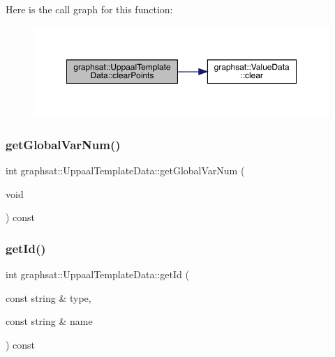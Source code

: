Here is the call graph for this function\+:
\nopagebreak
\begin{figure}[H]
\begin{center}
\leavevmode
\includegraphics[width=350pt]{classgraphsat_1_1_uppaal_template_data_a308dd0e29dc2eb35ec12c26597f6929b_cgraph}
\end{center}
\end{figure}
\mbox{\label{classgraphsat_1_1_uppaal_template_data_a2096eb0ebe7785f494c2bdcc02ac6bd8}} 
\subsubsection{\texorpdfstring{getGlobalVarNum()}{getGlobalVarNum()}}
{\footnotesize\ttfamily int graphsat\+::\+Uppaal\+Template\+Data\+::get\+Global\+Var\+Num (\begin{DoxyParamCaption}\item[{void}]{ }\end{DoxyParamCaption}) const\hspace{0.3cm}{\ttfamily [inline]}}

\mbox{\label{classgraphsat_1_1_uppaal_template_data_ab7517b8ab8d2c8372536603fb2dbf406}} 
\subsubsection{\texorpdfstring{getId()}{getId()}}
{\footnotesize\ttfamily int graphsat\+::\+Uppaal\+Template\+Data\+::get\+Id (\begin{DoxyParamCaption}\item[{const string \&}]{type,  }\item[{const string \&}]{name }\end{DoxyParamCaption}) const\hspace{0.3cm}{\ttfamily [inline]}}


